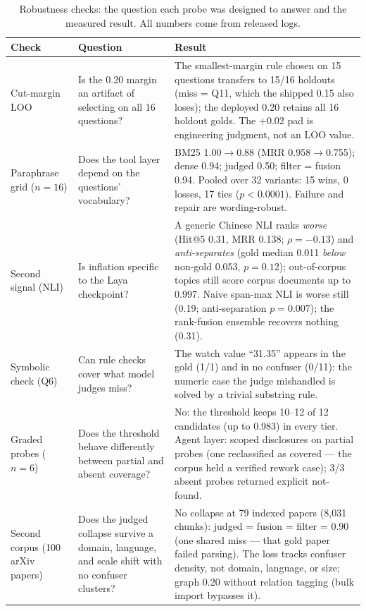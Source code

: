 \begin{table}[!htbp]
\centering
\footnotesize
\setlength{\tabcolsep}{2.5pt}
\caption{Robustness checks: the question each probe was designed to answer
and the measured result. All numbers come from released logs.}
\label{tab:robustness}
\begin{tabular}{p{2.7cm}p{3.9cm}p{5.9cm}}
\toprule
Check & Question & Result \\
\midrule
Cut-margin LOO & Is the 0.20 margin an artifact of selecting on all 16
questions? & The smallest-margin rule chosen on 15 questions transfers to
15/16 holdouts (miss = Q11, which the shipped 0.15 also loses); the
deployed 0.20 retains all 16 holdout golds. The $+0.02$ pad is
engineering judgment, not an LOO value. \\
Paraphrase grid ($n{=}16$) & Does the tool layer depend on the questions'
vocabulary? & BM25 1.00$\to$0.88 (MRR 0.958$\to$0.755); dense 0.94;
judged 0.50; filter = fusion 0.94. Pooled over 32 variants: 15 wins,
0 losses, 17 ties ($p < 0.0001$). Failure and repair are wording-robust. \\
Second signal (NLI) & Is inflation specific to the Laya checkpoint? &
A generic Chinese NLI ranks \emph{worse} (Hit@5 0.31, MRR 0.138;
$\rho = -0.13$) and \emph{anti-separates} (gold median 0.011 \emph{below}
non-gold 0.053, $p = 0.12$); out-of-corpus topics still score corpus
documents up to 0.997. Naive span-max NLI is worse still (0.19;
anti-separation $p = 0.007$); the rank-fusion ensemble recovers nothing
(0.31). \\
Symbolic check (Q6) & Can rule checks cover what model judges miss? &
The watch value ``31.35'' appears in the gold (1/1) and in no confuser
(0/11): the numeric case the judge mishandled is solved by a trivial
substring rule. \\
Graded probes ($n{=}6$) & Does the threshold behave differently between
partial and absent coverage? & No: the threshold keeps 10--12 of 12
candidates (up to 0.983) in every tier. Agent layer: scoped disclosures
on partial probes (one reclassified as covered --- the corpus held a
verified rework case); 3/3 absent probes returned explicit not-found. \\
Second corpus (100 arXiv papers) & Does the judged collapse survive a
domain, language, and scale shift with no confuser clusters? & No
collapse at 79 indexed papers (8{,}031 chunks): judged = fusion =
filter = 0.90 (one shared miss --- that gold paper failed parsing).
The loss tracks confuser density, not domain, language, or size;
graph 0.20 without relation tagging (bulk import bypasses it). \\
\bottomrule
\end{tabular}
\end{table}

